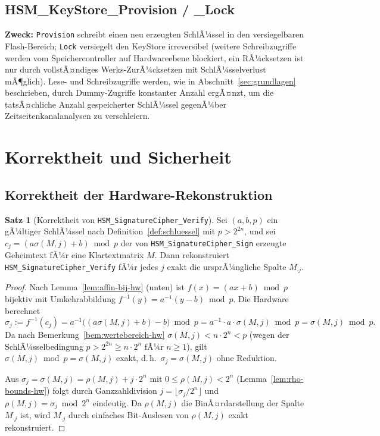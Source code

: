 ﻿\documentclass[a4paper,12pt]{article}
\theoremstyle{definition}
\newtheorem{satz}{Satz}
\begin{document}
\subsection{HSM\_KeyStore\_Provision / \_Lock}
\label{sec:funk-keystore}

\textbf{Zweck:} \texttt{Provision} schreibt einen neu erzeugten SchlÃ¼ssel in den versiegelbaren Flash-Bereich; \texttt{Lock} versiegelt den KeyStore irreversibel (weitere Schreibzugriffe werden vom Speichercontroller auf Hardwareebene blockiert, ein RÃ¼cksetzen ist nur durch vollstÃ¤ndiges Werks-ZurÃ¼cksetzen mit SchlÃ¼sselverlust mÃ¶glich). Lese- und Schreibzugriffe werden, wie in Abschnitt~\ref{sec:grundlagen} beschrieben, durch Dummy-Zugriffe konstanter Anzahl ergÃ¤nzt, um die tatsÃ¤chliche Anzahl gespeicherter SchlÃ¼ssel gegenÃ¼ber Zeitseitenkanalanalysen zu verschleiern.

\section{Korrektheit und Sicherheit}
\label{sec:korrektheit}

\subsection{Korrektheit der Hardware-Rekonstruktion}

\begin{satz}[Korrektheit von \texttt{HSM\_SignatureCipher\_Verify}]
	\label{satz:hw-korrektheit}
	Sei $(a,b,p)$ ein gÃ¼ltiger SchlÃ¼ssel nach Definition~\ref{def:schluessel} mit $p > 2^{2n}$, und sei $c_j = (a\sigma(M,j)+b) \bmod p$ der von \texttt{HSM\_SignatureCipher\_Sign} erzeugte Geheimtext fÃ¼r eine Klartextmatrix $M$. Dann rekonstruiert \texttt{HSM\_SignatureCipher\_Verify} fÃ¼r jedes $j$ exakt die ursprÃ¼ngliche Spalte $M_{\cdot j}$.
\end{satz}

\begin{proof}
	Nach Lemma~\ref{lem:affin-bij-hw} (unten) ist $f(x) = (ax+b)\bmod p$ bijektiv mit Umkehrabbildung $f^{-1}(y) = a^{-1}(y-b)\bmod p$. Die Hardware berechnet
	\[
	\sigma_j := f^{-1}(c_j) = a^{-1}\bigl((a\sigma(M,j)+b) - b\bigr) \bmod p = a^{-1} \cdot a \cdot \sigma(M,j) \bmod p = \sigma(M,j) \bmod p.
	\]
	Da nach Bemerkung~\ref{bem:wertebereich-hw} $\sigma(M,j) < n \cdot 2^n < p$ (wegen der SchlÃ¼sselbedingung $p > 2^{2n} \ge n \cdot 2^n$ fÃ¼r $n \ge 1$), gilt $\sigma(M,j) \bmod p = \sigma(M,j)$ exakt, d.\,h.\ $\sigma_j = \sigma(M,j)$ ohne Reduktion.
	
	Aus $\sigma_j = \sigma(M,j) = \rho(M,j) + j \cdot 2^n$ mit $0 \le \rho(M,j) < 2^n$ (Lemma~\ref{lem:rho-bounds-hw}) folgt durch Ganzzahldivision $j = \lfloor \sigma_j / 2^n \rfloor$ und $\rho(M,j) = \sigma_j \bmod 2^n$ eindeutig. Da $\rho(M,j)$ die BinÃ¤rdarstellung der Spalte $M_{\cdot j}$ ist, wird $M_{\cdot j}$ durch einfaches Bit-Auslesen von $\rho(M,j)$ exakt rekonstruiert. \qedhere
\end{proof}
\end{document}
